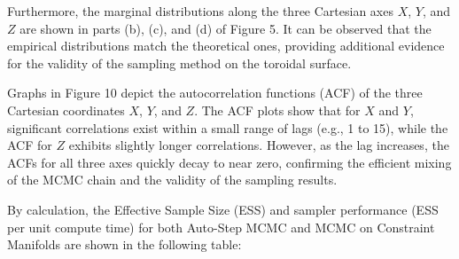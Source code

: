 \documentclass{article}
\begin{document}
Furthermore, the marginal distributions along the three Cartesian axes \( X \), \( Y \), and \( Z \) are shown in parts (b), (c), and (d) of Figure 5. It can be observed that the empirical distributions match the theoretical ones, providing additional evidence for the validity of the sampling method on the toroidal surface.




Graphs in Figure 10 depict the autocorrelation functions (ACF) of the three Cartesian coordinates \( X \), \( Y \), and \( Z \). The ACF plots show that for \( X \) and \( Y \), significant correlations exist within a small range of lags (e.g., 1 to 15), while the ACF for \( Z \) exhibits slightly longer correlations. However, as the lag increases, the ACFs for all three axes quickly decay to near zero, confirming the efficient mixing of the MCMC chain and the validity of the sampling results.

By calculation, the Effective Sample Size (ESS) and sampler performance (ESS per unit compute time) for both Auto-Step MCMC and MCMC on Constraint Manifolds are shown in the following table:
\end{document}
